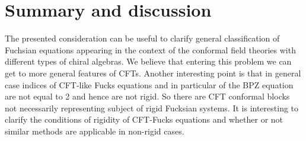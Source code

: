\documentclass[12pt,a4paper]{article}
\newcommand{\< }{{\langle}}
\renewcommand{\>}{{\rangle}}
\newcommand{\0}{\textbf{0.}}
\newcommand{\1}{\textbf{1.}}
\newcommand{\2}{\textbf{2.}}
\newcommand{\3}{\textbf{3.}}
\newcommand{\4}{\textbf{4.}}
\newcommand{\5}{\textbf{5.}}
\newcommand{\6}{\textbf{6.}}
\newcommand{\7}{\textbf{7.}}
\newcommand{\8}{\textbf{8.}}
\newcommand{\9}{\textbf{9.}}
\begin{document}
\section{Summary and discussion}
\label{summary}


The presented consideration can be useful to clarify  general classification of Fuchsian equations appearing in the context of the conformal field theories with different types of chiral algebras.  We believe  that entering  this problem we can get to more general features of CFTs. Another interesting point is that in general case indices of CFT-like Fucks equations and in particular of the BPZ equation \cite{bpz84} are not equal to 2 and hence are not rigid. So there are CFT conformal blocks not necessarily representing subject of rigid Fucksian systems. It is interesting to clarify the conditions of rigidity  of CFT-Fucks equations and whether or not similar methods are applicable in non-rigid cases. 


\appendix








\end{document}
